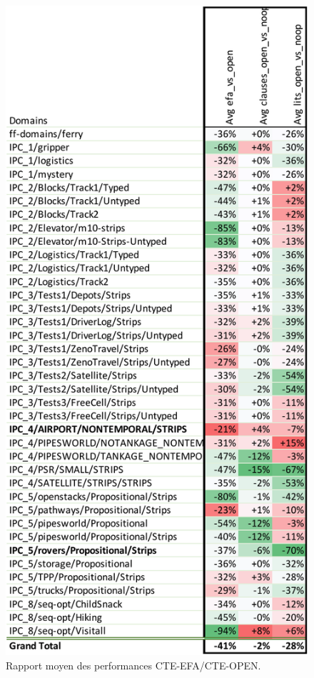\begin{figure}[ht!] \centering
\begin{center} \includegraphics[width=.75\textwidth]{figures/experiment-efa_vs_open-crop.pdf} \end{center}
\caption{Rapport moyen des performances CTE-EFA/CTE-OPEN.}
\label{fig:tab-exp-efa-vs-open}
\end{figure}





